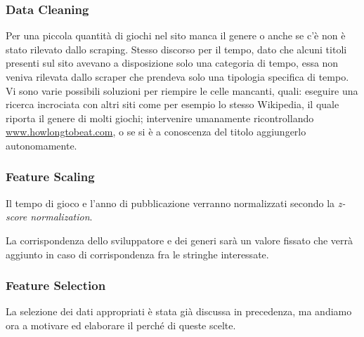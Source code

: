         \subsubsection{Data Cleaning}
            Per una piccola quantità di giochi nel sito manca il genere o anche se c'è non è stato rilevato dallo scraping. Stesso discorso per il tempo, dato che alcuni titoli presenti sul sito avevano a disposizione solo una categoria di tempo, essa non veniva rilevata dallo scraper che prendeva solo una tipologia specifica di tempo. Vi sono varie possibili soluzioni per riempire le celle mancanti, quali: eseguire una ricerca incrociata con altri siti come per esempio lo stesso Wikipedia, il quale riporta il genere di molti giochi; intervenire umanamente ricontrollando \url{www.howlongtobeat.com}, o se si è a conoscenza del titolo aggiungerlo autonomamente.
            
        \subsubsection{Feature Scaling}
            Il tempo di gioco e l'anno di pubblicazione verranno normalizzati secondo la \textit{z-score normalization}.
            
            La corrispondenza dello sviluppatore e dei generi sarà un valore fissato che verrà aggiunto in caso di corrispondenza fra le stringhe interessate.
            
        \subsubsection{Feature Selection}
            La selezione dei dati appropriati è stata già discussa in precedenza, ma andiamo ora a motivare ed elaborare il perché di queste scelte.
            
